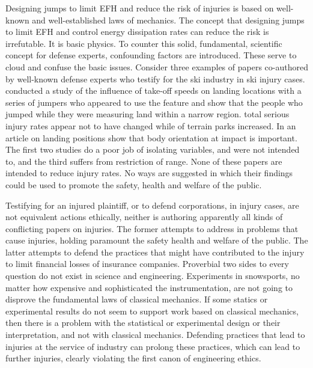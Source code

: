 \documentclass{article}
\begin{document}
Designing jumps to limit EFH and reduce the risk of injuries is based on
well-known and well-established laws of mechanics. The concept that designing
jumps to limit EFH and control energy dissipation rates can reduce the risk is
irrefutable. It is basic physics. To counter this solid, fundamental,
scientific concept for defense experts, confounding factors are introduced.
These serve to cloud and confuse the basic issues. Consider three examples of
papers co-authored by well-known defense experts who testify for the ski
industry in ski injury cases. \cite{Shealy2010} conducted a study of the
influence of take-off speeds on landing locations with a series of jumpers who
appeared to use the feature and show that the people who jumped while they were
measuring land within a narrow region. \cite{Shealy2015} total serious
injury rates appear not to have changed while of terrain parks increased. In an
article on landing positions \cite{Scher2015} show that body orientation at
impact is important. The first two studies do a poor job of isolating
variables, and were not intended to, and the third suffers from restriction of
range. None of these papers are intended to reduce injury rates. No ways are
suggested in which their findings could be used to promote the safety, health
and welfare of the public.

Testifying for an injured plaintiff, or to defend corporations, in injury
cases, are not equivalent actions ethically, neither is authoring apparently
all kinds of conflicting papers on injuries. The former attempts to address in
problems that cause injuries, holding paramount the safety health and welfare
of the public. The latter attempts to defend the practices that might have
contributed to the injury to limit financial losses of insurance companies.
Proverbial two sides to every question do not exist in science and engineering.
Experiments in snowsports, no matter how expensive and sophisticated the
instrumentation, are not going to disprove the fundamental laws of classical
mechanics. If some statics or experimental results do not seem to support work
based on classical mechanics, then there is a problem with the statistical or
experimental design or their interpretation, and not with classical mechanics.
Defending practices that lead to injuries at the service of industry can
prolong these practices, which can lead to further injuries, clearly violating
the first canon of engineering ethics.
\end{document}
